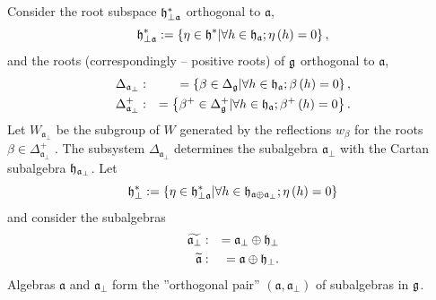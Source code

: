 \documentclass[12pt]{iopart}
\theoremstyle{definition}
\newcommand{\af}{\mathfrak{a}}
\newcommand{\hf}{\mathfrak{h}}
\begin{document}
Consider the root subspace
$\frak{h}_{\perp \af}^{\ast }$ orthogonal to  $\af$,
\begin{equation*}
\frak{h}_{\perp \af}^{\ast }:=\left\{ \eta \in \frak{h}^{\ast }
|\forall h \in \hf_{\af};  \eta\left(h \right)=0 \right\} ,
\end{equation*}
and the roots (correspondingly -- positive roots) of $\frak{g}$ orthogonal
to $\af$,
\begin{eqnarray*}
\Delta _{\af_{\perp }} &:&=\left\{ \beta \in \Delta _{\frak{g}}|
\forall h \in \hf_{\af};  \beta\left(h \right)=0  \right\} , \\
\Delta _{\af_{\perp }}^{+} &:&=\left\{ \beta ^{+}\in \Delta _{\frak{g}%
}^{+}|\forall h \in \hf_{\af};  \beta^{+}\left(h \right)=0  \right\} .
\end{eqnarray*}
Let $W_{\af_{\perp }}$ be the subgroup of $W$ generated by the
reflections $w _{\beta }$ for the roots $\beta \in \Delta _{\af%
_{\perp }}^{+}$ . The subsystem $\Delta _{\af_{\perp }}$ determines the
subalgebra $\af_{\perp }$ with the Cartan subalgebra $\frak{h}_{\af%
_{\perp }}$. Let
\begin{equation*}
\frak{h}_{\perp }^{\ast }:=\left\{ \eta \in \frak{h}_{\perp \af}^{\ast
}|\forall h \in \hf_{\af\oplus \af_{\perp}}; \eta \left( h \right)=0 \right\}
\end{equation*}
and consider the subalgebras
\begin{eqnarray*}
\widetilde{\af_{\perp }} &:&=\af_{\perp }\oplus \frak{h}_{\perp }
\\
\widetilde{\af} &:&=\af\oplus \frak{h}_{\perp }.
\end{eqnarray*}
Algebras $\af$ and $\af_{\perp }$ form the ''orthogonal pair''
$\left( \af,\af_{\perp}\right) $
of subalgebras in $\frak{g}$.
\end{document}
